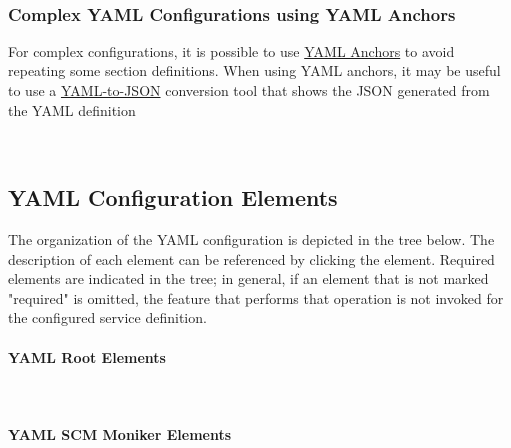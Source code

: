 

\newpage
\noindent\\


\subsubsection{Complex YAML Configurations using YAML Anchors}

For complex configurations, it is possible to use 
\href{https://docs.docker.com/compose/compose-file/10-fragments/}{YAML Anchors}
to avoid repeating some section definitions.  When using YAML anchors, it may be useful
to use a \href{https://onlineyamltools.com/convert-yaml-to-json}{YAML-to-JSON} conversion tool that shows the JSON generated from the YAML
definition

\noindent\\

\subsection{YAML Configuration Elements}\label{sec:yaml-config}

The organization of the YAML configuration is depicted in the tree below.  The description of each element
can be referenced by clicking the element.  Required elements are indicated in the tree; in general, if an
element that is not marked "required" is omitted, the feature that performs that operation is not invoked
for the configured service definition.

\paragraph{YAML Root Elements}

\noindent\\


\pagebreak
\paragraph{YAML SCM Moniker Elements}\label{sec:moniker-elements}
\noindent\\

